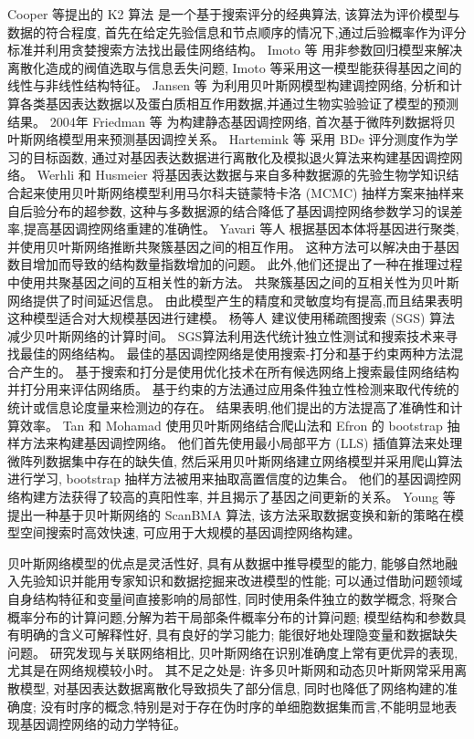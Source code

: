 Cooper 等提出的 K2 算法 \cite{cooper1992bayesian} 是一个基于搜索评分的经典算法,
该算法为评价模型与数据的符合程度,
首先在给定先验信息和节点顺序的情况下,通过后验概率作为评分标准并利用贪婪搜索方法找出最佳网络结构。
Imoto 等 \cite{kim2003inferring} 用非参数回归模型来解决离散化造成的阀值选取与信息丢失问题,
Imoto 等采用这一模型能获得基因之间的线性与非线性结构特征。
Jansen 等 \cite{jansen2003bayesian} 为利用贝叶斯网模型构建调控网络,
分析和计算各类基因表达数据以及蛋白质相互作用数据,并通过生物实验验证了模型的预测结果。
2004年 Friedman 等 \cite{friedman2004inferring} 为构建静态基因调控网络,
首次基于微阵列数据将贝叶斯网络模型用来预测基因调控关系。
Hartemink 等 \cite{hartemink2005reverse} 采用 BDe 评分测度作为学习的目标函数,
通过对基因表达数据进行离散化及模拟退火算法来构建基因调控网络。
Werhli 和 Husmeier \cite{werhli2007reconstructing} 将基因表达数据与来自多种数据源的先验生物学知识结合起来使用贝叶斯网络模型利用马尔科夫链蒙特卡洛 (MCMC) 抽样方案来抽样来自后验分布的超参数,
这种与多数据源的结合降低了基因调控网络参数学习的误差率,提高基因调控网络重建的准确性。
Yavari 等人 \cite{yavari2008gene} 根据基因本体将基因进行聚类,
并使用贝叶斯网络推断共聚簇基因之间的相互作用。
这种方法可以解决由于基因数目增加而导致的结构数量指数增加的问题。 
此外,他们还提出了一种在推理过程中使用共聚基因之间的互相关性的新方法。
共聚簇基因之间的互相关性为贝叶斯网络提供了时间延迟信息。 
由此模型产生的精度和灵敏度均有提高,而且结果表明这种模型适合对大规模基因进行建模。
杨等人 \cite{yang2011bayesian} 建议使用稀疏图搜索 (SGS) 算法减少贝叶斯网络的计算时间。
SGS算法利用迭代统计独立性测试和搜索技术来寻找最佳的网络结构。
最佳的基因调控网络是使用搜索-打分和基于约束两种方法混合产生的。
基于搜索和打分是使用优化技术在所有候选网络上搜索最佳网络结构并打分用来评估网络质。
基于约束的方法通过应用条件独立性检测来取代传统的统计或信息论度量来检测边的存在。
结果表明,他们提出的方法提高了准确性和计算效率。
Tan 和 Mohamad \cite{kunga2012using} 使用贝叶斯网络结合爬山法和 Efron 的 bootstrap 抽样方法来构建基因调控网络。
他们首先使用最小局部平方 (LLS) 插值算法来处理微阵列数据集中存在的缺失值, 
然后采用贝叶斯网络建立网络模型并采用爬山算法进行学习, 
bootstrap 抽样方法被用来抽取高置信度的边集合。
他们的基因调控网络构建方法获得了较高的真阳性率, 并且揭示了基因之间更新的关系。 
Young 等 \cite{young2014fast} 提出一种基于贝叶斯网络的 ScanBMA 算法,
该方法采取数据变换和新的策略在模型空间搜索时高效快速,
可应用于大规模的基因调控网络构建。

贝叶斯网络模型的优点是灵活性好, 具有从数据中推导模型的能力, 能够自然地融入先验知识并能用专家知识和数据挖掘来改进模型的性能;
可以通过借助问题领域自身结构特征和变量间直接影响的局部性, 同时使用条件独立的数学概念, 将聚合概率分布的计算问题,分解为若干局部条件概率分布的计算问题;
模型结构和参数具有明确的含义可解释性好, 具有良好的学习能力; 能很好地处理隐变量和数据缺失问题。
研究发现与关联网络相比, 贝叶斯网络在识别准确度上常有更优异的表现, 尤其是在网络规模较小时。
其不足之处是: 许多贝叶斯网和动态贝叶斯网常采用离散模型, 对基因表达数据离散化导致损失了部分信息,
同时也降低了网络构建的准确度;
没有时序的概念,特别是对于存在伪时序的单细胞数据集而言,不能明显地表现基因调控网络的动力学特征。


